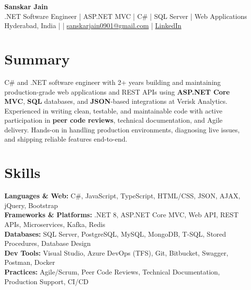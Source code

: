 \documentclass[10pt,letterpaper]{article}
\begin{document}
\begin{center}
    {\Large \textbf{Sanskar Jain}} \\
    .NET Software Engineer \;|\; ASP.NET MVC \;|\; C\# \;|\; SQL Server \;|\; Web Applications \\
    Hyderabad, India \enspace |  \enspace | \enspace
    \href{mailto:sanskarjain0901@gmail.com}{sanskarjain0901@gmail.com} \enspace | \enspace
    \href{https://www.linkedin.com/in/sanskar-jain0901/}{LinkedIn}
\end{center}

\vspace{2pt}

\section*{Summary}
C\# and .NET software engineer with 2+ years building and maintaining production-grade web applications and REST APIs using \textbf{ASP.NET Core MVC}, \textbf{SQL} databases, and \textbf{JSON}-based integrations at Verisk Analytics. Experienced in writing clean, testable, and maintainable code with active participation in \textbf{peer code reviews}, technical documentation, and Agile delivery. Hands-on in handling production environments, diagnosing live issues, and shipping reliable features end-to-end.

\section*{Skills}
\textbf{Languages \& Web:} C\#, JavaScript, TypeScript, HTML/CSS, JSON, AJAX, jQuery, Bootstrap \\
\textbf{Frameworks \& Platforms:} .NET 8, ASP.NET Core MVC, Web API, REST APIs, Microservices, Kafka, Redis \\
\textbf{Databases:} SQL Server, PostgreSQL, MySQL, MongoDB, T-SQL, Stored Procedures, Database Design \\
\textbf{Dev Tools:} Visual Studio, Azure DevOps (TFS), Git, Bitbucket, Swagger, Postman, Docker \\
\textbf{Practices:} Agile/Scrum, Peer Code Reviews, Technical Documentation, Production Support, CI/CD
\end{document}
